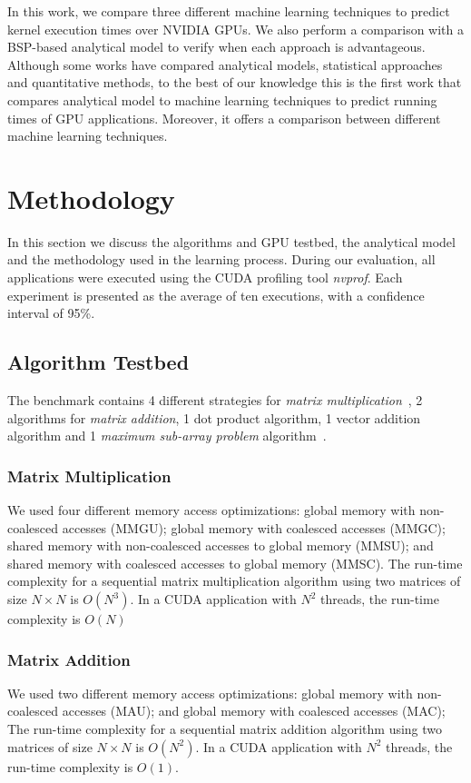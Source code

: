 In this work, we compare three different machine learning techniques to predict kernel execution times over NVIDIA GPUs. We also perform a comparison with a BSP-based analytical model to verify when each approach is advantageous. Although some works have compared analytical models, statistical approaches and quantitative methods, to the best of our knowledge this is the first work that compares analytical model to machine learning techniques to predict running times of GPU applications. Moreover, it offers a comparison between different machine learning techniques.

\section{Methodology}\label{sec:Metho}
In this section we discuss the algorithms and GPU testbed, the analytical model and the methodology used in the learning process. During our evaluation, all applications were executed using the CUDA profiling tool \textit{nvprof}. Each experiment is presented as the average of ten executions, with a confidence interval of 95\%.

\subsection{Algorithm Testbed}\label{ssec:AlgTestbed}
The benchmark contains 4 different strategies for \emph{matrix multiplication}~\cite{CUDAGuide}, 2 algorithms for \emph{matrix addition}, 1 dot product algorithm, 1 vector addition algorithm and 1 \emph{maximum sub-array problem} algorithm~\cite{Cleber:Thesis}.

\subsubsection{\textbf{Matrix Multiplication}}
We used four different memory access optimizations: global memory with non-coalesced accesses (MMGU); global memory with coalesced accesses (MMGC); shared memory with non-coalesced accesses to global memory (MMSU); and shared memory with coalesced accesses to global memory (MMSC). The run-time complexity for a sequential matrix multiplication algorithm using two 
matrices of size $N\times{}N$ is $O(N^3)$. In a CUDA application with $N^2$ threads, the run-time complexity is $O(N)$ 

\subsubsection{\textbf{Matrix Addition}}
We used two different memory access optimizations: global memory with non-coalesced accesses (MAU); and global memory with coalesced accesses (MAC);  The run-time complexity for a sequential matrix addition algorithm using two 
matrices of size $N\times{}N$ is $O(N^2)$. In a CUDA application with $N^2$ threads, the run-time complexity is $O(1)$.

